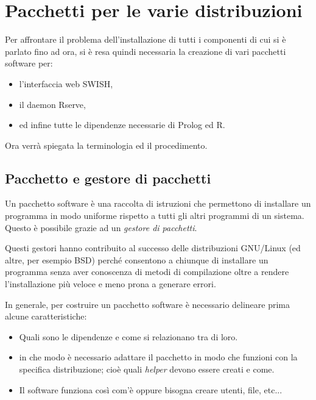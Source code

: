 \documentclass[10pt,titlepage,twoside,a4paper]{report}
\begin{document}


\chapter{Pacchetti per le varie distribuzioni} 
\label{ch:pacchetti-per-le-varie-distribuzioni}
Per affrontare il problema dell'installazione di tutti i componenti di cui si 
è parlato fino ad ora, si è resa quindi necessaria la creazione di vari 
pacchetti software per:
\begin{itemize}
    \item l'interfaccia web SWISH,
    \item il daemon Rserve,
    \item ed infine tutte le dipendenze necessarie di Prolog ed R.
\end{itemize}

Ora verrà spiegata la terminologia ed il procedimento.


\section{Pacchetto e gestore di pacchetti} \label{pacchetto-e-gestore-di-pacchetti}
Un pacchetto software è una raccolta di istruzioni che permettono di 
installare un programma in modo uniforme rispetto a tutti gli altri programmi 
di un sistema. Questo è possibile grazie ad un \emph{gestore di 
pacchetti}.

Questi gestori hanno contribuito al successo delle distribuzioni GNU/Linux (ed 
altre, per esempio BSD) perché consentono a chiunque di installare un 
programma senza aver conoscenza di metodi di compilazione oltre a rendere 
l'installazione più veloce e meno prona a generare errori.

In generale, per costruire un pacchetto software è necessario delineare prima 
alcune caratteristiche:
\begin{itemize}
    \item Quali sono le dipendenze e come si relazionano tra di loro.
    \item in che modo è necessario adattare il pacchetto in modo che funzioni 
          con la specifica distribuzione; cioè quali \emph{helper} devono 
essere creati e come.
    \item Il software funziona così com'è oppure bisogna creare utenti, 
file, etc...
\end{itemize}
\end{document}

